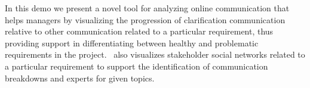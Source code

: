 
In this demo we present a novel tool for analyzing online communication that helps managers by visualizing the progression of clarification communication relative to other communication related to a particular requirement, thus providing support in differentiating between healthy and problematic requirements in the project. 
\viss\ also visualizes stakeholder social networks related to a particular requirement to support the identification of communication breakdowns and experts for given topics.



